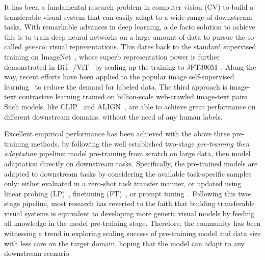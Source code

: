 \documentclass[10pt,twocolumn,letterpaper]{article}
\begin{document}
It has been a fundamental research problem in computer vision (CV) to
build a transferable visual system that can easily adapt to a wide range of downstream tasks. With remarkable advances in deep learning, a de facto solution to achieve this is to train deep neural networks on a large amount of data to pursue the so-called {\it generic} visual representations. This dates back to the standard supervised training on ImageNet~\cite{deng2009imagenet}, whose superb representation power is further demonstrated in BiT~\cite{kolesnikov2020big}/ViT~\cite{dosovitskiy2020image} by scaling up the training to JFT300M~\cite{sun2017revisiting}. Along the way, recent efforts have been applied to the popular image self-supervised learning~\cite{he2020momentum,chen2020simple,he2022masked} to reduce the demand for labeled data. The third approach is image-text contrastive learning trained on billion-scale web-crawled image-text pairs. Such models, like CLIP~\cite{radford2021learning} and ALIGN~\cite{jia2021scaling}, are able to achieve great performance on different downstream domains, without the need of any human labels.

Excellent empirical performance has been achieved with the above three pre-training methods, by following the well established two-stage {\it pre-training then adaptation} pipeline: model pre-training from scratch on large data, then model adaptation directly on downstream tasks. Specifically, the pre-trained models are adapted to downstream tasks by considering the available task-specific samples only: either evaluated in a zero-shot task transfer manner, or updated using linear probing (LP)~\cite{radford2021learning}, finetuning (FT)~\cite{li2022elevater}, or prompt tuning~\cite{zhou2022learning,saito2022prefix}. 
Following this two-stage pipeline, most research has reverted to the faith that building transferable visual systems is equivalent to developing more generic visual models by feeding all knowledge in the model pre-training stage. Therefore, the community has been witnessing a trend in exploring scaling success of pre-training model and data size with less care on the target domain,  hoping that the model can adapt to any downstream scenario. 
\end{document}
